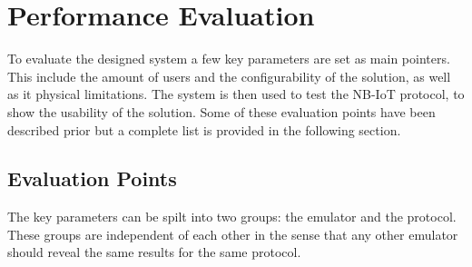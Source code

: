 \chapter{Performance Evaluation}

To evaluate the designed system a few key parameters are set as main pointers. This include the amount of users and the configurability of the solution, as well as it physical limitations. The system is then used to test the NB-IoT protocol, to show the usability of the solution. Some of these evaluation points have been described prior but a complete list is provided in the following section.

\section{Evaluation Points}
The key parameters can be spilt into two groups: the emulator and the protocol. These groups are independent of each other in the sense that any other emulator should reveal the same results for the same protocol.

